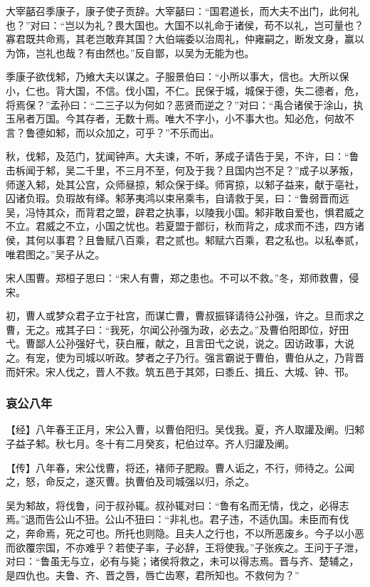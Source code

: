 \documentclass[]{article}
\begin{document}
大宰嚭召季康子，康子使子贡辞。大宰嚭曰：``国君道长，而大夫不出门，此何礼也？''对曰：``岂以为礼？畏大国也。大国不以礼命于诸侯，苟不以礼，岂可量也？寡君既共命焉，其老岂敢弃其国？大伯端委以治周礼，仲雍嗣之，断发文身，赢以为饰，岂礼也哉？有由然也。''反自鄫，以吴为无能为也。

季康子欲伐邾，乃飨大夫以谋之。子服景伯曰：``小所以事大，信也。大所以保小，仁也。背大国，不信。伐小国，不仁。民保于城，城保于德，失二德者，危，将焉保？''孟孙曰：``二三子以为何如？恶贤而逆之？''对曰：``禹合诸侯于涂山，执玉帛者万国。今其存者，无数十焉。唯大不字小，小不事大也。知必危，何故不言？鲁德如邾，而以众加之，可乎？''不乐而出。

秋，伐邾，及范门，犹闻钟声。大夫谏，不听，茅成子请告于吴，不许，曰：``鲁击柝闻于邾，吴二千里，不三月不至，何及于我？且国内岂不足？''成子以茅叛，师遂入邾，处其公宫，众师昼掠，邾众保于绎。师宵掠，以邾子益来，献于亳社，囚诸负瑕。负瑕故有绎。邾茅夷鸿以束帛乘韦，自请救于吴，曰：``鲁弱晋而远吴，冯恃其众，而背君之盟，辟君之执事，以陵我小国。邾非敢自爱也，惧君威之不立。君威之不立，小国之忧也。若夏盟于鄫衍，秋而背之，成求而不违，四方诸侯，其何以事君？且鲁赋八百乘，君之贰也。邾赋六百乘，君之私也。以私奉贰，唯君图之。''吴子从之。

宋人围曹。郑桓子思曰：``宋人有曹，郑之患也。不可以不救。''冬，郑师救曹，侵宋。

初，曹人或梦众君子立于社宫，而谋亡曹，曹叔振铎请待公孙强，许之。旦而求之曹，无之。戒其子曰：``我死，尔闻公孙强为政，必去之。''及曹伯阳即位，好田弋。曹鄙人公孙强好弋，获白雁，献之，且言田弋之说，说之。因访政事，大说之。有宠，使为司城以听政。梦者之子乃行。强言霸说于曹伯，曹伯从之，乃背晋而奸宋。宋人伐之，晋人不救。筑五邑于其郊，曰黍丘、揖丘、大城、钟、邗。

\hypertarget{header-n3121}{%
\subsubsection{哀公八年}\label{header-n3121}}

【经】八年春王正月，宋公入曹，以曹伯阳归。吴伐我。夏，齐人取讙及阐。归邾子益子邾。秋七月。冬十有二月癸亥，杞伯过卒。齐人归讙及阐。

【传】八年春，宋公伐曹，将还，褚师子肥殿。曹人诟之，不行，师待之。公闻之，怒，命反之，遂灭曹。执曹伯及司城强以归，杀之。

吴为邾故，将伐鲁，问于叔孙辄。叔孙辄对曰：``鲁有名而无情，伐之，必得志焉。''退而告公山不狃。公山不狃曰：``非礼也。君子违，不适仇国。未臣而有伐之，奔命焉，死之可也。所托也则隐。且夫人之行也，不以所恶废乡。今子以小恶而欲覆宗国，不亦难乎？若使子率，子必辞，王将使我。''子张疾之。王问于子泄，对曰：``鲁虽无与立，必有与毙；诸侯将救之，未可以得志焉。晋与齐、楚辅之，是四仇也。夫鲁、齐、晋之唇，唇亡齿寒，君所知也。不救何为？''
\end{document}
